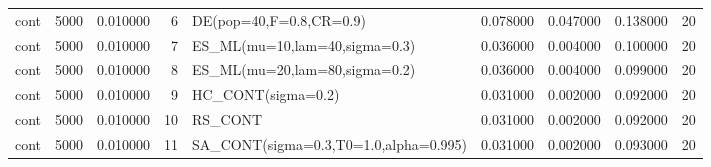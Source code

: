 \begin{longtable}{lrrrlrrrr}
cont & 5000 & 0.010000 & 6 & DE(pop=40,F=0.8,CR=0.9) & 0.078000 & 0.047000 & 0.138000 & 20 \\
cont & 5000 & 0.010000 & 7 & ES\_ML(mu=10,lam=40,sigma=0.3) & 0.036000 & 0.004000 & 0.100000 & 20 \\
cont & 5000 & 0.010000 & 8 & ES\_ML(mu=20,lam=80,sigma=0.2) & 0.036000 & 0.004000 & 0.099000 & 20 \\
cont & 5000 & 0.010000 & 9 & HC\_CONT(sigma=0.2) & 0.031000 & 0.002000 & 0.092000 & 20 \\
cont & 5000 & 0.010000 & 10 & RS\_CONT & 0.031000 & 0.002000 & 0.092000 & 20 \\
cont & 5000 & 0.010000 & 11 & SA\_CONT(sigma=0.3,T0=1.0,alpha=0.995) & 0.031000 & 0.002000 & 0.093000 & 20 \\
\end{longtable}
